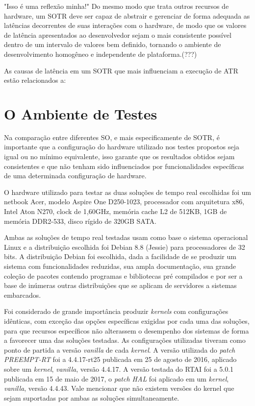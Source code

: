 "Isso é uma reflexão minha!" Do mesmo modo que trata outros recursos de hardware, um SOTR deve ser capaz de abstrair e gerenciar de forma adequada as latências decorrentes de suas interações com o hardware, de modo que os valores de latência apresentados ao desenvolvedor sejam o mais consistente possível dentro de um intervalo de valores bem definido, tornando o ambiente de desenvolvimento homogêneo e independente de plataforma.(???)

As causas de latência em um SOTR que mais influenciam a execução de ATR estão relacionados a:

\section{O Ambiente de Testes}
Na comparação entre diferentes SO, e mais especificamente de SOTR,  é importante que a configuração do hardware utilizado nos testes propostos seja igual ou no mínimo equivalente, isso garante que os resultados obtidos sejam consistentes e que não tenham sido influenciados por funcionalidades específicas de uma determinada configuração de hardware.

O hardware utilizado para testar as duas soluções de tempo real escolhidas foi um netbook Acer, modelo Aspire One D250-1023, processador com arquitetura x86, Intel Aton N270, clock de 1,60GHz, memória cache L2 de 512KB, 1GB de memória DDR2-533, disco rígido de 320GB SATA.

Ambas as soluções de tempo real testadas usam como base o sistema operacional Linux e a distribuição escolhida foi Debian 8.8 (Jessie) para processadores de 32 bits. A distribuição Debian foi escolhida, dada a facilidade de se produzir um sistema com funcionalidades reduzidas, sua ampla documentação, sua grande coleção de pacotes contendo programas e bibliotecas pré compilados e por ser a base de inúmeras outras distribuições que se aplicam de servidores a sistemas embarcados. 

Foi considerado de grande importância produzir \textit{kernels} com configurações idênticas, com exceção das opções específicas exigidas por cada uma das soluções, para que recursos específicos não alterassem o desempenho dos sistemas de forma a favorecer uma das soluções testadas. As configurações utilizadas tiveram como ponto de partida a versão \textit{vanilla} de cada \textit{kernel}. A versão utilizada do \textit{patch PREEMPT-RT} foi a 4.4.17-rt25 publicada em 25 de agosto de 2016, aplicado sobre um \textit{kernel}, \textit{vanilla}, versão 4.4.17. A versão testada do RTAI foi a 5.0.1 publicada em 15 de maio de 2017, o \textit{patch HAL} foi aplicado em um \textit{kernel}, \textit{vanilla}, versão 4.4.43. Vale mencionar que não existem versões do kernel que sejam suportadas por ambas as soluções simultaneamente.

